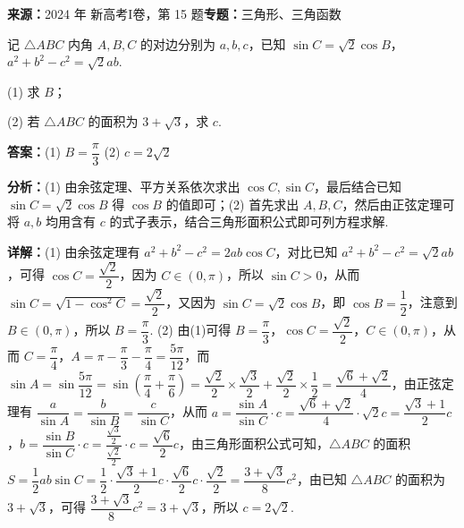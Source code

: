 \begin{question}[points=13]
\textbf{来源：}2024 年 新高考I卷，第 15 题\quad \textbf{专题：}三角形、三角函数\par
记 $\triangle ABC$ 内角 $A,B,C$ 的对边分别为 $a,b,c$，已知 $\sin C=\sqrt{2}\cos B$，$a^2+b^2-c^2=\sqrt{2}ab$.

(1) 求 $B$；

(2) 若 $\triangle ABC$ 的面积为 $3+\sqrt{3}$，求 $c$.
\begin{solution}
\textbf{答案：}(1) $B=\dfrac{\pi}{3}$ (2) $c=2\sqrt{2}$

\textbf{分析：}(1) 由余弦定理、平方关系依次求出 $\cos C,\sin C$，最后结合已知 $\sin C=\sqrt{2}\cos B$ 得 $\cos B$ 的值即可；(2) 首先求出 $A,B,C$，然后由正弦定理可将 $a,b$ 均用含有 $c$ 的式子表示，结合三角形面积公式即可列方程求解.

\textbf{详解：}(1) 由余弦定理有 $a^2+b^2-c^2=2ab\cos C$，对比已知 $a^2+b^2-c^2=\sqrt{2}ab$，可得 $\cos C=\dfrac{\sqrt{2}}{2}$，因为 $C\in(0,\pi)$，所以 $\sin C>0$，从而 $\sin C=\sqrt{1-\cos^2 C}=\dfrac{\sqrt{2}}{2}$，又因为 $\sin C=\sqrt{2}\cos B$，即 $\cos B=\dfrac{1}{2}$，注意到 $B\in(0,\pi)$，所以 $B=\dfrac{\pi}{3}$.
(2) 由(1)可得 $B=\dfrac{\pi}{3}$，$\cos C=\dfrac{\sqrt{2}}{2}$，$C\in(0,\pi)$，从而 $C=\dfrac{\pi}{4}$，$A=\pi-\dfrac{\pi}{3}-\dfrac{\pi}{4}=\dfrac{5\pi}{12}$，而 $\sin A=\sin\dfrac{5\pi}{12}=\sin\left(\dfrac{\pi}{4}+\dfrac{\pi}{6}\right)=\dfrac{\sqrt{2}}{2}\times\dfrac{\sqrt{3}}{2}+\dfrac{\sqrt{2}}{2}\times\dfrac{1}{2}=\dfrac{\sqrt{6}+\sqrt{2}}{4}$，由正弦定理有 $\dfrac{a}{\sin A}=\dfrac{b}{\sin B}=\dfrac{c}{\sin C}$，从而 $a=\dfrac{\sin A}{\sin C}\cdot c=\dfrac{\sqrt{6}+\sqrt{2}}{4}\cdot\sqrt{2}c=\dfrac{\sqrt{3}+1}{2}c$，$b=\dfrac{\sin B}{\sin C}\cdot c=\dfrac{\frac{\sqrt{3}}{2}}{\frac{\sqrt{2}}{2}}\cdot c=\dfrac{\sqrt{6}}{2}c$，由三角形面积公式可知，$\triangle ABC$ 的面积 $S=\dfrac{1}{2}ab\sin C=\dfrac{1}{2}\cdot\dfrac{\sqrt{3}+1}{2}c\cdot\dfrac{\sqrt{6}}{2}c\cdot\dfrac{\sqrt{2}}{2}=\dfrac{3+\sqrt{3}}{8}c^2$，由已知 $\triangle ABC$ 的面积为 $3+\sqrt{3}$，可得 $\dfrac{3+\sqrt{3}}{8}c^2=3+\sqrt{3}$，所以 $c=2\sqrt{2}$.
\end{solution}
\end{question}

